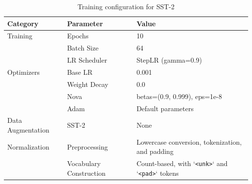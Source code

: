 \documentclass{article}
\begin{document}

\begin{table}[H]
\centering
\caption{Training configuration for SST-2}
\label{tab:sst2_train_config}
\begin{tabular}{l|l|l}
\hline
\textbf{Category} & \textbf{Parameter} & \textbf{Value} \\
\hline
Training & Epochs & 10 \\
         & Batch Size & 64 \\
         & LR Scheduler & StepLR (gamma=0.9) \\
\hline
Optimizers & Base LR & 0.001 \\
           & Weight Decay & 0.0 \\
           & Nova & betas=(0.9, 0.999), eps=1e-8 \\
           & Adam & Default parameters \\
\hline
Data Augmentation & SST-2 & None \\
\hline
Normalization & Preprocessing & Lowercase conversion, tokenization, and padding \\
              & Vocabulary Construction & Count-based, with `\texttt{<unk>}` and `\texttt{<pad>}` tokens \\
\hline
\end{tabular}
\end{table}
\end{document}
